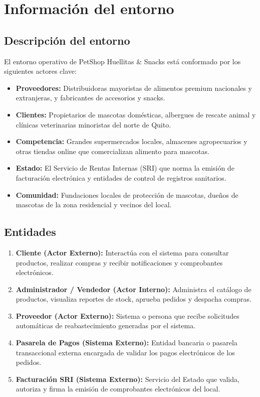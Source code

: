 \section{Información del entorno}

\subsection{Descripción del entorno}
El entorno operativo de PetShop Huellitas \& Snacks está conformado por los siguientes actores clave:
\begin{itemize}
    \item \textbf{Proveedores:} Distribuidoras mayoristas de alimentos premium nacionales y extranjeras, y fabricantes de accesorios y snacks.
    \item \textbf{Clientes:} Propietarios de mascotas domésticas, albergues de rescate animal y clínicas veterinarias minoristas del norte de Quito.
    \item \textbf{Competencia:} Grandes supermercados locales, almacenes agropecuarios y otras tiendas online que comercializan alimento para mascotas.
    \item \textbf{Estado:} El Servicio de Rentas Internas (SRI) que norma la emisión de facturación electrónica y entidades de control de registros sanitarios.
    \item \textbf{Comunidad:} Fundaciones locales de protección de mascotas, dueños de mascotas de la zona residencial y vecinos del local.
\end{itemize}

\subsection{Entidades}
\begin{enumerate}
    \item \textbf{Cliente (Actor Externo):} Interactúa con el sistema para consultar productos, realizar compras y recibir notificaciones y comprobantes electrónicos.
    \item \textbf{Administrador / Vendedor (Actor Interno):} Administra el catálogo de productos, visualiza reportes de stock, aprueba pedidos y despacha compras.
    \item \textbf{Proveedor (Actor Externo):} Sistema o persona que recibe solicitudes automáticas de reabastecimiento generadas por el sistema.
    \item \textbf{Pasarela de Pagos (Sistema Externo):} Entidad bancaria o pasarela transaccional externa encargada de validar los pagos electrónicos de los pedidos.
    \item \textbf{Facturación SRI (Sistema Externo):} Servicio del Estado que valida, autoriza y firma la emisión de comprobantes electrónicos del local.
\end{enumerate}


